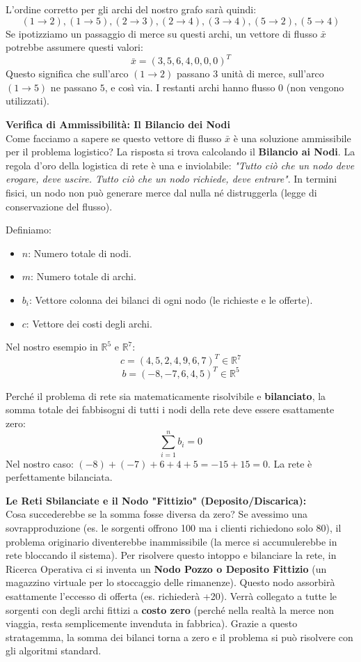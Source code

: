 \documentclass[12pt, a4paper]{article}
\begin{document}
	L'ordine corretto per gli archi del nostro grafo sarà quindi:
	\[ (1\to2), (1\to5), (2\to3), (2\to4), (3\to4), (5\to2), (5\to4) \]
	Se ipotizziamo un passaggio di merce su questi archi, un vettore di flusso $\bar{x}$ potrebbe assumere questi valori:
	\[ \bar{x} = (3, 5, 6, 4, 0, 0, 0)^T \]
	Questo significa che sull'arco $(1\to2)$ passano $3$ unità di merce, sull'arco $(1\to5)$ ne passano $5$, e così via. I restanti archi hanno flusso $0$ (non vengono utilizzati).
	
	\vspace{0.4cm}
	\textbf{Verifica di Ammissibilità: Il Bilancio dei Nodi}\\
	Come facciamo a sapere se questo vettore di flusso $\bar{x}$ è una soluzione ammissibile per il problema logistico? La risposta si trova calcolando il \textbf{Bilancio ai Nodi}. 
	La regola d'oro della logistica di rete è una e inviolabile: \textit{"Tutto ciò che un nodo deve erogare, deve uscire. Tutto ciò che un nodo richiede, deve entrare"}. In termini fisici, un nodo non può generare merce dal nulla né distruggerla (legge di conservazione del flusso).
	
	Definiamo:
	\begin{itemize}[label=$\circ$, itemsep=2pt, leftmargin=1.5cm]
		\item $n$: Numero totale di nodi.
		\item $m$: Numero totale di archi.
		\item $b_i$: Vettore colonna dei bilanci di ogni nodo (le richieste e le offerte).
		\item $c$: Vettore dei costi degli archi.
	\end{itemize}
	Nel nostro esempio in $\mathbb{R}^5$ e $\mathbb{R}^7$:
	\[ c = (4, 5, 2, 4, 9, 6, 7)^T \in \mathbb{R}^7 \]
	\[ b = (-8, -7, 6, 4, 5)^T \in \mathbb{R}^5 \]
	
	Perché il problema di rete sia matematicamente risolvibile e \textbf{bilanciato}, la somma totale dei fabbisogni di tutti i nodi della rete deve essere esattamente zero:
	\[ \sum_{i=1}^n b_i = 0 \]
	Nel nostro caso: $(-8) + (-7) + 6 + 4 + 5 = -15 + 15 = 0$. La rete è perfettamente bilanciata.
	
	\textbf{Le Reti Sbilanciate e il Nodo "Fittizio" (Deposito/Discarica):}\\
	Cosa succederebbe se la somma fosse diversa da zero? Se avessimo una sovrapproduzione (es. le sorgenti offrono 100 ma i clienti richiedono solo 80), il problema originario diventerebbe inammissibile (la merce si accumulerebbe in rete bloccando il sistema). 
	Per risolvere questo intoppo e bilanciare la rete, in Ricerca Operativa ci si inventa un \textbf{Nodo Pozzo o Deposito Fittizio} (un magazzino virtuale per lo stoccaggio delle rimanenze). Questo nodo assorbirà esattamente l'eccesso di offerta (es. richiederà +20). Verrà collegato a tutte le sorgenti con degli archi fittizi a \textbf{costo zero} (perché nella realtà la merce non viaggia, resta semplicemente invenduta in fabbrica). Grazie a questo stratagemma, la somma dei bilanci torna a zero e il problema si può risolvere con gli algoritmi standard.
	
\end{document}
